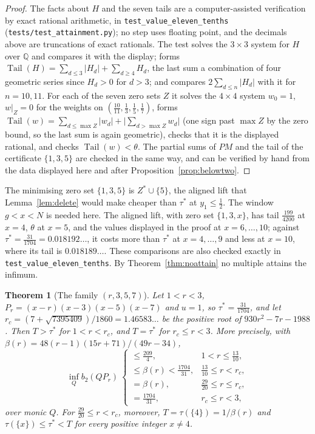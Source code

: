 \documentclass[11pt]{article}
\newtheorem{theorem}{Theorem}[section]
\theoremstyle{definition}
\theoremstyle{plain}
\DeclareMathOperator{\Tail}{Tail}
\begin{document}
\begin{proof}
The facts about $H$ and the seven tails are a computer-assisted
verification by exact rational arithmetic, in \texttt{test\_value\_eleven\_tenths}
(\texttt{tests/test\_attainment.py}); no step uses floating point, and the
decimals above are truncations of exact rationals.  The test solves the
$3\times3$ system for $H$ over $\mathbb Q$ and compares it with the display;
forms $\Tail(H)=\sum_{d\le3}|H_d|+\sum_{d\ge4}H_d$, the last sum a
combination of four geometric series since $H_d>0$ for $d>3$; and compares
$2\sum_{d\le n}|H_d|$ with it for $n=10,11$.  For each of the seven zero
sets $Z$ it solves the $4\times4$ system $w_0=1$, $w|_Z=0$ for the weights
on $(\tfrac{10}{11},\tfrac13,\tfrac15,\tfrac17)$, forms
$\Tail(w)=\sum_{d\le\max Z}|w_d|+\bigl|\sum_{d>\max Z}w_d\bigr|$ (one sign
past $\max Z$ by the zero bound, so the last sum is again geometric),
checks that it is the displayed rational, and checks $\Tail(w)<\theta$.  The partial sums of $PM$ and the tail of
the certificate $\{1,3,5\}$ are checked in the same way, and can be
verified by hand from the data displayed here and after
Proposition~\ref{prop:belowtwo}.
\end{proof}

The minimising zero set $\{1,3,5\}$ is $Z^*\cup\{5\}$, the aligned lift that
Lemma~\ref{lem:delete} would make cheaper than $\tau^*$ at $y_1\le\tfrac12$.
The window $g<x<N$ is needed here.  The aligned lift, with zero set
$\{1,3,x\}$, has tail $\tfrac{199}{4200}$ at $x=4$, $\theta$ at $x=5$, and
the values displayed in the proof at $x=6,\ldots,10$; against
$\tau^*=\tfrac{31}{1704}=0.018192\ldots$, it costs more than $\tau^*$ at
$x=4,\ldots,9$ and less at $x=10$, where its tail is $0.018189\ldots$.
These comparisons are also checked exactly in
\texttt{test\_value\_eleven\_tenths}.  By Theorem~\ref{thm:noattain} no
multiple attains the infimum.

\begin{theorem}[The family $(r,3,5,7)$]\label{thm:family}
Let $1<r<3$, $P_r=(x-r)(x-3)(x-5)(x-7)$ and $u=1$, so $\tau^*=\tfrac{31}{1704}$,
and let $r_c=(7+\sqrt{7395409})/1860=1.46583\ldots$ be the positive root of
$930r^2-7r-1988$.  Then $T>\tau^*$ for $1<r<r_c$, and $T=\tau^*$ for
$r_c\le r<3$.  More precisely, with $\beta(r)=48(r-1)(15r+71)/(49r-34)$,
\[
  \inf_Qb_2(QP_r)\ \begin{cases}
    \le\tfrac{209}{4}, & 1<r\le\tfrac{13}{10},\\[2pt]
    \le\beta(r)<\tfrac{1704}{31}, & \tfrac{13}{10}\le r<r_c,\\[2pt]
    =\beta(r), & \tfrac{29}{20}\le r\le r_c,\\[2pt]
    =\tfrac{1704}{31}, & r_c\le r<3,
  \end{cases}
\]
over monic $Q$.  For $\tfrac{29}{20}\le r<r_c$, moreover,
$T=\tau(\{4\})=1/\beta(r)$ and $\tau(\{x\})\le\tau^*<T$ for every
positive integer $x\ne4$.
\end{theorem}
\end{document}
